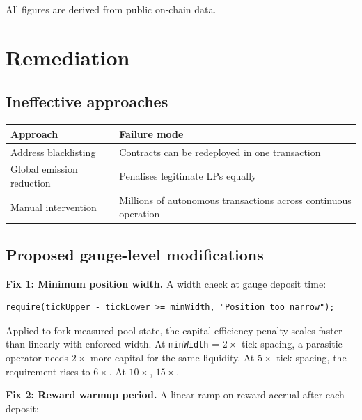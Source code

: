 \documentclass[11pt,a4paper]{article}
\theoremstyle{definition}
\begin{document}
All figures are derived from public on-chain data.

\section{Remediation}\label{sec:remediation}

\subsection{Ineffective approaches}\label{sec:ineffective}

\begin{table}[H]
\centering
\begin{tabular}{@{}ll@{}}
\toprule
Approach & Failure mode \\
\midrule
Address blacklisting & Contracts can be redeployed in one transaction \\
Global emission reduction & Penalises legitimate LPs equally \\
Manual intervention & Millions of autonomous transactions across continuous operation \\
\bottomrule
\end{tabular}
\end{table}

\subsection{Proposed gauge-level modifications}\label{sec:fixes}

\textbf{Fix 1: Minimum position width.} A width check at gauge deposit time:


\begin{center}\begin{minipage}{0.85\textwidth}\begin{verbatim}
require(tickUpper - tickLower >= minWidth, "Position too narrow");
\end{verbatim}\end{minipage}\end{center}


Applied to fork-measured pool state, the capital-efficiency penalty scales faster than linearly with enforced width. At \texttt{minWidth} = $2\times$ tick spacing, a parasitic operator needs $2\times$ more capital for the same liquidity. At $5\times$ tick spacing, the requirement rises to $6\times$. At $10\times$, $15\times$.

\textbf{Fix 2: Reward warmup period.} A linear ramp on reward accrual after each deposit:
\end{document}
